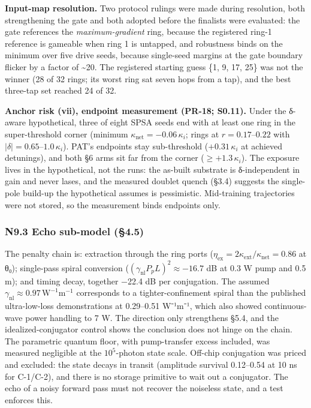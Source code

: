 \documentclass[
  10pt,
]{article}
\begin{document}
\textbf{Input-map resolution.} Two protocol rulings were made during
resolution, both strengthening the gate and both adopted before the
finalists were evaluated: the gate references the
\emph{maximum-gradient} ring, because the registered ring-1 reference is
gameable when ring 1 is untapped, and robustness binds on the minimum
over five drive seeds, because single-seed margins at the gate boundary
flicker by a factor of \textasciitilde20. The registered starting guess
\{1, 9, 17, 25\} was not the winner (28 of 32 rings; its worst ring sat
seven hops from a tap), and the best three-tap set reached 24 of 32.

\textbf{Anchor risk (vii), endpoint measurement (PR-18; S0.11).} Under
the δ-aware hypothetical, three of eight SPSA seeds end with at least
one ring in the super-threshold corner (minimum
\(\kappa_\text{net} = -0.06\,\kappa_i\); rings at \(r = 0.17\)--\(0.22\)
with \(|\delta| = 0.65\)--\(1.0\,\kappa_i\)). PAT's endpoints stay
sub-threshold (\(+0.31\,\kappa_i\) at achieved detunings), and both §6
arms sit far from the corner (\(\geq +1.3\,\kappa_i\)). The exposure
lives in the hypothetical, not the runs: the as-built substrate is
δ-independent in gain and never lases, and the measured doublet quench
(§3.4) suggests the single-pole build-up the hypothetical assumes is
pessimistic. Mid-training trajectories were not stored, so the
measurement binds endpoints only.

\subsubsection{N9.3 Echo sub-model
(§4.5)}\label{n9.3-echo-sub-model-4.5}

The penalty chain is: extraction through the ring ports
(\(\eta_\text{ex} = 2\kappa_\text{ext}/\kappa_\text{net} = 0.86\) at
θ₀); single-pass spiral conversion
(\((\gamma_\text{nl} P_p L)^2 \approx -16.7\) dB at 0.3 W pump and 0.5
m); and timing decay, together −22.4 dB per conjugation. The assumed
\(\gamma_\text{nl} \approx 0.97\,\text{W}^{-1}
\text{m}^{-1}\) corresponds to a tighter-confinement spiral than the
published ultra-low-loss demonstrations at 0.29--0.51 W⁻¹m⁻¹, which also
showed continuous-wave power handling to 7 W. The direction only
strengthens §5.4, and the idealized-conjugator control shows the
conclusion does not hinge on the chain. The parametric quantum floor,
with pump-transfer excess included, was measured negligible at the
\(10^5\)-photon state scale. Off-chip conjugation was priced and
excluded: the state decays in transit (amplitude survival 0.12--0.54 at
10 ns for C-1/C-2), and there is no storage primitive to wait out a
conjugator. The echo of a noisy forward pass must not recover the
noiseless state, and a test enforces this.
\end{document}
